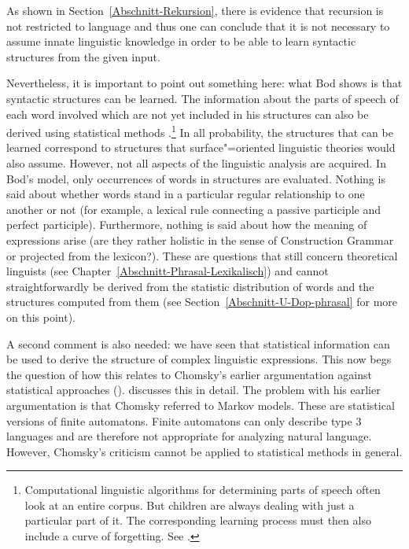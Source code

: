 As shown in Section~\ref{Abschnitt-Rekursion}, there is evidence that recursion is not restricted to language and thus one can conclude that it is not 
necessary to assume innate linguistic knowledge in order to be able to learn syntactic structures from the given input.

Nevertheless, it is important to point out something here: what Bod shows is that syntactic structures can be learned.
The information about the parts of speech of each word involved which are not yet included in his structures can also be derived using
statistical methods \citep{RCF98a,Clark2000a}.\footnote{%
	Computational linguistic algorithms for determining parts of speech often look at an entire corpus. But children are always
	dealing with just a particular part of it. The corresponding learning process must then also include a
	curve of forgetting. See . 
} 
In all probability, the structures that can be learned correspond to structures that surface"=oriented linguistic theories would also assume. However, not
all aspects of the linguistic analysis are acquired. In Bod's model, only occurrences of words in structures are evaluated.
Nothing is said about whether words stand in a particular regular relationship to one another or not (for example, a lexical rule connecting a passive
participle and perfect participle). Furthermore, nothing is said about how the meaning of expressions arise (are they rather  holistic in the sense of Construction
Grammar or projected from the lexicon?). These are questions that still concern theoretical linguists (see Chapter~\ref{Abschnitt-Phrasal-Lexikalisch}) 
and cannot straightforwardly be derived from the statistic distribution of words and the structures computed from them (see Section~\ref{Abschnitt-U-Dop-phrasal}
for more on this point).

A second comment is also needed: we have seen that statistical information can be used to derive the structure of complex linguistic expressions. This now
begs the question of how this relates to Chomsky's earlier argumentation against statistical approaches
(\citealp[]{Chomsky57a}). \citet[Section~4.2]{Abney96a} discusses this in detail. The problem with his earlier argumentation is that Chomsky referred
 to Markov models. These are statistical versions of finite automatons. Finite automatons can only describe
type 3 languages and are therefore not appropriate for analyzing natural
language. However, Chomsky's criticism cannot be applied to statistical methods
in general.

